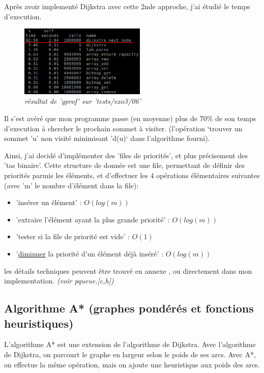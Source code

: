 \documentclass[10pt]{article}
\begin{document}
				Après avoir implementé Dijkstra avec cette 2nde approche, j'ai étudié le temps d'execution.
				\begin{figure}[H]
					\begin{center}
						\includegraphics[width=6cm,height=\textheight,keepaspectratio]{./images/no_pqueue.png}
					\end{center}
				    \caption{\textit{résultat de 'gprof' sur 'tests/exo3/06'}}
				\end{figure}
				Il s'est avéré que mon programme passe (en moyenne) plus de 70\% de
				son temps d'execution à chercher le prochain sommet à visiter.
				(l'opération `trouver un sommet 'u' non visité minimisant 'd(u)` dans l'algorithme fourni).\newline
				
				Ainsi, j'ai decidé d'implémenter des 'files de priorités', et plus précisement des 'tas binaire'.
				Cette structure de donnée est une file, permettant de définir des priorités parmis les éléments,
				et d'effectuer les 4 opérations élémentaires suivantes (avec 'm' le nombre d'élément dans la file):
				\begin{itemize}[label=-]
					\item 'insérer un élément' : \(O(log(m))\)
					\item 'extraire l'élément ayant la plus grande priorité' : \({O(log(m))}\)
					\item 'tester si la file de priorité est vide' : \(O(1)\)
					\item '\underline{diminuer} la priorité d'un élément déjà inséré' : \(O(log(m))\)
				\end{itemize}
				les détails techniques peuvent être trouvé en annexe \cite{binary_heap},
				ou directement dans mon implementation. \textit{(voir pqueue.[c,h])}

		\subsection{Algorithme A* (graphes pondérés et fonctions heuristiques)}
			L'algorithme A* est une extension de l'algorithme de Dijkstra. Avec l'algorithme de Dijkstra, on parcourt
			le graphe en largeur selon le poids de ses arcs. Avec A*, on effectue la même opération,
			mais on ajoute une heuristique \cite{heuristique} aux poids des arcs.\newline
			
\end{document}
